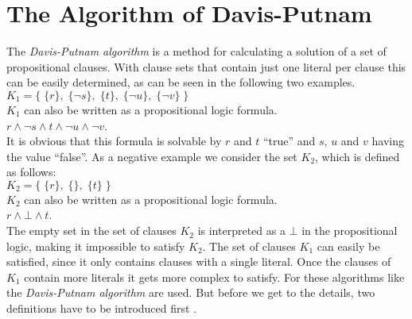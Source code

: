 \section{The Algorithm of Davis-Putnam}
\label{sec:sciDavisPutnam}
The \textit{Davis-Putnam algorithm} is a method for calculating a solution of a set of propositional clauses. With clause sets that contain just one literal per clause this can be easily determined, as can be seen in the following two examples.
\\[0.2cm]
\hspace*{1.3cm} $K_1 = \bigl\{\; \{r\},\; \{\neg s\},\; \{t\},\; \{\neg u\}, \; \{\neg v\} \;\bigr\}$ 
\\[0.2cm]
$K_1$ can also be written as a propositional logic formula.
\\[0.2cm]
\hspace*{1.3cm} $r \land \neg s \land t \land \neg u \land \neg v$.
\\[0.2cm]
It is obvious that this formula is solvable by $r$ and $t$ \enquote{true} and $s$, $u$ and $v$ having the value \enquote{false}.
As a negative example we consider the set $K_2$, which is defined as follows:
\\[0.2cm]
\hspace*{1.3cm} $K_2 = \bigl\{\; \{r\},\; \{\},\; \{t\} \;\bigr\}$
\\[0.2cm]
$K_2$ can also be written as a propositional logic formula.
\\[0.2cm]
\hspace*{1.3cm}
$r \land \bot \land t$.
\\[0.2cm]
The empty set in the set of clauses $K_2$ is interpreted as a $\bot$ in the propositional logic, making it impossible to satisfy $K_2$. The set of clauses $K_1$ can easily be satisfied, since it only contains clauses with a single literal. Once the clauses of $K_1$ contain more literals it gets more complex to satisfy. For these algorithms like the \textit{Davis-Putnam algorithm} are used. But before we get to the details, two definitions have to be introduced first \cite{Zhang2000}. 

